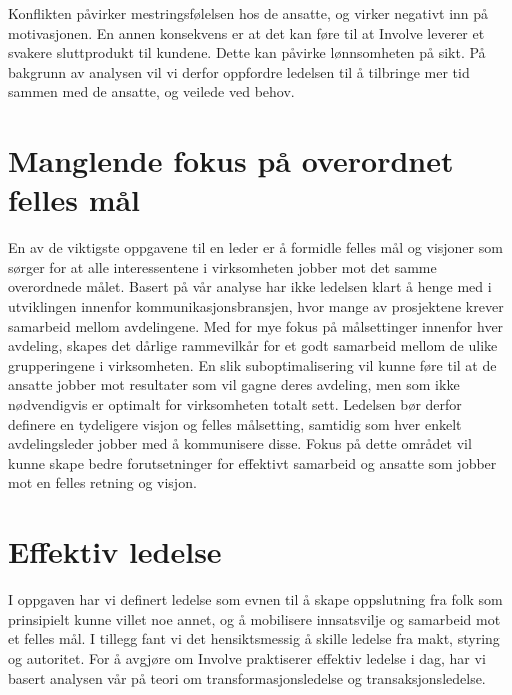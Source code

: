 \indent \newline
Konflikten påvirker mestringsfølelsen hos de ansatte, og virker negativt inn på motivasjonen. En annen konsekvens er at det kan føre til at Involve leverer et svakere sluttprodukt til kundene. Dette kan påvirke lønnsomheten på sikt. På bakgrunn av analysen vil vi derfor oppfordre ledelsen til å tilbringe mer tid sammen med de ansatte, og veilede ved behov. 

\section{Manglende fokus på overordnet felles mål}
En av de viktigste oppgavene til en leder er å formidle felles mål og visjoner som sørger for at alle interessentene i virksomheten jobber mot det samme overordnede målet. Basert på vår analyse har ikke ledelsen klart å henge med i utviklingen innenfor kommunikasjonsbransjen, hvor mange av prosjektene krever samarbeid mellom avdelingene. Med for mye fokus på målsettinger innenfor hver avdeling, skapes det dårlige rammevilkår for et godt samarbeid mellom de ulike grupperingene i virksomheten. En slik suboptimalisering vil kunne føre til at de ansatte jobber mot resultater som vil gagne deres avdeling, men som ikke nødvendigvis er optimalt for virksomheten totalt sett. Ledelsen bør derfor definere en tydeligere visjon og felles målsetting, samtidig som hver enkelt avdelingsleder jobber med å kommunisere disse. Fokus på dette området vil kunne skape bedre forutsetninger for effektivt samarbeid og ansatte som jobber mot en felles retning og visjon. 

\section{Effektiv ledelse}
I oppgaven har vi definert ledelse som evnen til å skape oppslutning fra folk som prinsipielt kunne villet noe annet, og å mobilisere innsatsvilje og samarbeid mot et felles mål. I tillegg fant vi det hensiktsmessig å skille ledelse fra makt, styring og autoritet. For å avgjøre om Involve praktiserer effektiv ledelse i dag, har vi basert analysen vår på teori om transformasjonsledelse og transaksjonsledelse.


